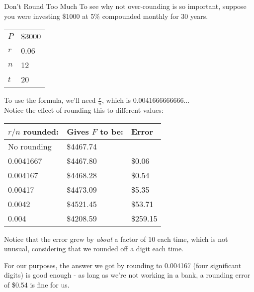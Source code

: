 \begin{example}[https://www.youtube.com/watch?v=o_iz3lt-GiU]{Don't Round Too Much}
To see why not over-rounding is so important, suppose you were investing \$1000 at 5\% compounded monthly for 30 years.
\begin{center}
\begin{tabular}{l l}
$P$ & \$3000\\
$r$ & 0.06\\
$n$ & 12\\
$t$ & 20
\end{tabular}
\end{center}
To use the formula, we'll need $\frac{r}{n}$, which is 0.0041666666666$\ldots$\\

Notice the effect of rounding this to different values:
\begin{center}
\begin{tabular}{l l l}
$r/n$ rounded: & Gives $F$ to be: & Error\\
\hline
No rounding & \$4467.74 & \\
0.0041667 & \$4467.80 & \$0.06\\
0.004167 & \$4468.28 & \$0.54\\
0.00417 & \$4473.09 & \$5.35\\
0.0042 & \$4521.45 & \$53.71\\
0.004 & \$4208.59 & \$259.15
\end{tabular}
\end{center}
Notice that the error grew by \textit{about} a factor of 10 each time, which is not unusual, considering that we rounded off a digit each time.  

For our purposes, the answer we got by rounding to 0.004167 (four significant digits) is good enough - as long as we're not working in a bank, a rounding error of \$0.54 is fine for us.
\end{example}

